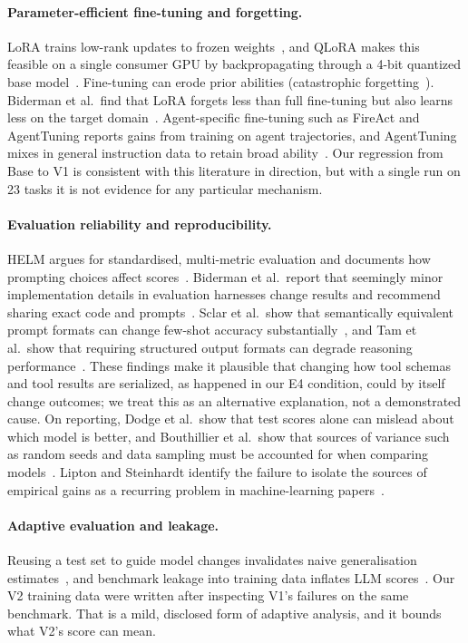 \documentclass[runningheads]{llncs}
\begin{document}
\paragraph{Parameter-efficient fine-tuning and forgetting.}
LoRA trains low-rank updates to frozen weights~\cite{hu2022lora}, and QLoRA makes this feasible on a single consumer GPU by backpropagating through a 4-bit quantized base model~\cite{dettmers2023qlora}. Fine-tuning can erode prior abilities (catastrophic forgetting~\cite{kirkpatrick2017ewc}). Biderman et al.\ find that LoRA forgets less than full fine-tuning but also learns less on the target domain~\cite{biderman2024loraforgets}. Agent-specific fine-tuning such as FireAct and AgentTuning reports gains from training on agent trajectories, and AgentTuning mixes in general instruction data to retain broad ability~\cite{chen2023fireact,zeng2024agenttuning}. Our regression from Base to V1 is consistent with this literature in direction, but with a single run on 23 tasks it is not evidence for any particular mechanism.

\paragraph{Evaluation reliability and reproducibility.}
HELM argues for standardised, multi-metric evaluation and documents how prompting choices affect scores~\cite{liang2023helm}. Biderman et al.\ report that seemingly minor implementation details in evaluation harnesses change results and recommend sharing exact code and prompts~\cite{biderman2024lessons}. Sclar et al.\ show that semantically equivalent prompt formats can change few-shot accuracy substantially~\cite{sclar2024formatting}, and Tam et al.\ show that requiring structured output formats can degrade reasoning performance~\cite{tam2024speakfreely}. These findings make it plausible that changing how tool schemas and tool results are serialized, as happened in our E4 condition, could by itself change outcomes; we treat this as an alternative explanation, not a demonstrated cause. On reporting, Dodge et al.\ show that test scores alone can mislead about which model is better, and Bouthillier et al.\ show that sources of variance such as random seeds and data sampling must be accounted for when comparing models~\cite{dodge2019showyourwork,bouthillier2021variance}. Lipton and Steinhardt identify the failure to isolate the sources of empirical gains as a recurring problem in machine-learning papers~\cite{lipton2019troubling}.

\paragraph{Adaptive evaluation and leakage.}
Reusing a test set to guide model changes invalidates naive generalisation estimates~\cite{dwork2015reusable}, and benchmark leakage into training data inflates LLM scores~\cite{zhou2023cheater}. Our V2 training data were written after inspecting V1's failures on the same benchmark. That is a mild, disclosed form of adaptive analysis, and it bounds what V2's score can mean.
\end{document}
